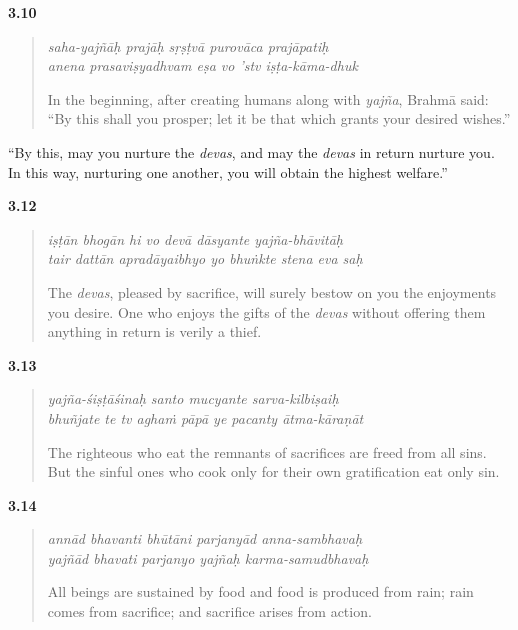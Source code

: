 \par\noindent\textbf{3.10}\par
\begin{verse}
\textit{saha-yajñāḥ prajāḥ sṛṣṭvā purovāca prajāpatiḥ} \\
\textit{anena prasaviṣyadhvam eṣa vo ’stv iṣṭa-kāma-dhuk}

\noindent In the beginning, after creating humans along with \textit{yajña}, Brahmā said: \enquote{By this shall you prosper; let it be that which grants your desired wishes.}
\end{verse}
\par


{\enquote{By this, may you nurture the \textit{devas}, and may the \textit{devas} in return nurture you. In this way, nurturing one another, you will obtain the highest welfare.}}


\par\noindent\textbf{3.12}\par
\begin{verse}
\textit{iṣṭān bhogān hi vo devā dāsyante yajña-bhāvitāḥ} \\
\textit{tair dattān apradāyaibhyo yo bhuṅkte stena eva saḥ}

\noindent The \textit{devas}, pleased by sacrifice, will surely bestow on you the enjoyments you desire. One who enjoys the gifts of the \textit{devas} without offering them anything in return is verily a thief.
\end{verse}
\par



\par\noindent\textbf{3.13}\par
\begin{verse}
\textit{yajña-śiṣṭāśinaḥ santo mucyante sarva-kilbiṣaiḥ} \\
\textit{bhuñjate te tv aghaṁ pāpā ye pacanty ātma-kāraṇāt}

\noindent The righteous who eat the remnants of sacrifices are freed from all sins. But the sinful ones who cook only for their own gratification eat only sin.
\end{verse}
\par



\par\noindent\textbf{3.14}\par
\begin{verse}
\textit{annād bhavanti bhūtāni parjanyād anna-sambhavaḥ} \\
\textit{yajñād bhavati parjanyo yajñaḥ karma-samudbhavaḥ}

\noindent All beings are sustained by food and food is produced from rain; rain comes from sacrifice; and sacrifice arises from action.
\end{verse}
\par



